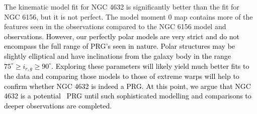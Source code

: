 \documentclass[fleqn,usenatbib]{mnras}
\newcommand{\hi}{\text{H\,\sc{i}}}
\begin{document}
The kinematic model fit for NGC 4632 is significantly better than the fit for NGC 6156, but it is not perfect.  The model moment 0 map contains more of the features seen in the observations compared to the NGC 6156 model and \textcolor{black}{observations}.  \textcolor{black}{However, our perfectly polar models are very strict and do not encompass the full range of PRG's seen in nature.  Polar structures may be slightly elliptical and have inclinations from the galaxy body in the range $75^{\circ}\ge i_{r,g}\ge90^{\circ}$.  Exploring these parameters will likely yield much better fits to the data and comparing those models to those of extreme warps will help to confirm whether NGC 4632 is indeed a PRG. At this point, we argue that NGC 4632 is a \textcolor{black}{potential \hi\ PRG} until such sophisticated modelling and comparisons to deeper observations are completed.}
\end{document}
